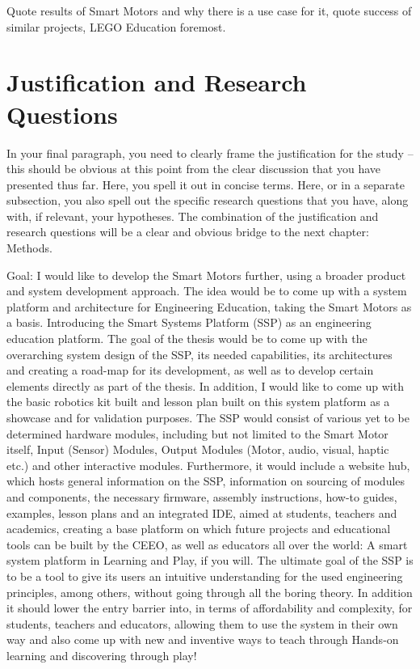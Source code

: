 Quote results of Smart Motors and why there is a use case for it, quote success of similar projects, LEGO Education foremost. 

\section{\label{sec:intro_res_quest}Justification and Research Questions}

In your final paragraph, you need to clearly frame the justification for the study -- this should be obvious at this point from the clear discussion that you have presented thus far. Here, you spell it out in concise terms. Here, or in a separate subsection, you also spell out the specific research questions that you have, along with, if relevant, your hypotheses. The combination of the justification and research questions will be a clear and obvious bridge to the next chapter: Methods.


Goal:
I would like to develop the Smart Motors further, using a broader product and system development approach. The idea would be to come up with a system platform and architecture for Engineering Education, taking the Smart Motors as a basis. Introducing the Smart Systems Platform (SSP) as an engineering education platform. The goal of the thesis would be to come up with the overarching system design of the SSP, its needed capabilities, its architectures and creating a road-map for its development, as well as to develop certain elements directly as part of the thesis. In addition, I would like to come up with the basic robotics kit built and lesson plan built on this system platform as a showcase and for validation purposes.
The SSP would consist of various yet to be determined hardware modules, including but not limited to the Smart Motor itself, Input (Sensor) Modules, Output Modules (Motor, audio, visual, haptic etc.) and other interactive modules. Furthermore, it would include a website hub, which hosts general information on the SSP, information on sourcing of modules and components, the necessary firmware, assembly instructions, how-to guides, examples, lesson plans and an integrated IDE, aimed at students, teachers and academics, creating a base platform on which future projects and educational tools can be built by the CEEO, as well as educators all over the world: A smart system platform in Learning and Play, if you will.
The ultimate goal of the SSP is to be a tool to give its users an intuitive understanding for the used engineering principles, among others, without going through all the boring theory. In addition it should lower the entry barrier into, in terms of affordability and complexity, for students, teachers and educators, allowing them to use the system in their own way and also come up with new and inventive ways to teach through Hands-on learning and discovering through play!


